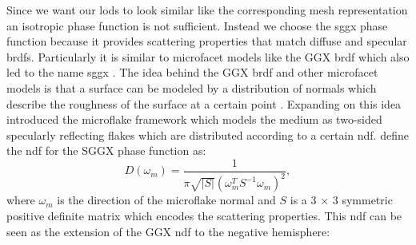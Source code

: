 Since we want our \acp{lod} to look similar like the corresponding mesh representation an isotropic phase function is not sufficient.
Instead we choose the \acs{sggx} phase function \cite{sggx} because it provides scattering properties that match diffuse and specular \acsp{brdf}.
Particularly it is similar to microfacet models like the GGX \acs{brdf} \cite{ggx} which also led to the name \acf{sggx} \cite{sggx}.
The idea behind the GGX \ac{brdf} and other microfacet models is that a surface can be modeled by a distribution of normals which describe the roughness of the surface at a certain point \cite{ggx}.
Expanding on this idea \citeauthor{microflake} \cite{microflake} introduced the microflake framework which models the medium as two-sided specularly reflecting flakes which are distributed according to a certain \ac{ndf}.
\citeauthor{sggx} \cite{sggx} define the \ac{ndf} for the SGGX phase function as:
\begin{equation}
    D(\omega_m)=\frac{1}{\pi \sqrt{|S|}(\omega_m^T S^{-1} \omega_m)^2},
\end{equation}
where $\omega_m$ is the direction of the microflake normal and $S$ is a 3 $\times$ 3 symmetric positive definite matrix which encodes the scattering properties.
This \ac{ndf} can be seen as the extension of the GGX \acs{ndf} to the negative hemisphere:

